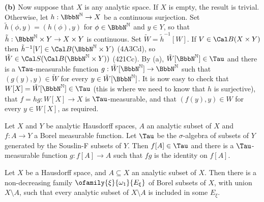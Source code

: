 {\medskip

{\bf (b)} Now suppose that $X$ is any analytic space.   If $X$ is empty,
the result is trivial.   Otherwise, let
$h:\NN\to X$ be a continuous surjection.   Set
$\tilde h(\phi,y)=(h(\phi),y)$ for $\phi\in\NN$ and $y\in Y$, so that
$\tilde h:\NN\times Y\to X\times Y$ is continuous.   Set
$\tilde W=\tilde h^{-1}[W]$.   If
$V\in\Cal B(X\times Y)$ then $\tilde h^{-1}[V]\in\Cal B(\NN\times Y)$
(4A3Cd), so  $\tilde W\in\Cal S(\Cal B(\NN\times Y))$ (421Cc).
By (a), $\tilde W[\NN]\in\Tau$ and there is a $\Tau$-measurable function
$g:\tilde W[\NN]\to\NN$ such that $(g(y),y)\in\tilde W$ for every
$y\in\tilde W[\NN]$.   It is now easy to check that
$W[X]=\tilde W[\NN]\in\Tau$ (this is where we need to know that $h$ is
surjective), that $f=hg:W[X]\to X$ is $\Tau$-measurable, and that
$(f(y),y)\in W$ for every $y\in W[X]$, as required.
}%


 Let $X$ and $Y$ be analytic
Hausdorff spaces, $A$ an analytic subset of $X$ and $f:A\to Y$ a Borel 
measurable function.   Let
$\Tau$ be the $\sigma$-algebra of subsets of $Y$ generated by the
Souslin-F subsets of $Y$.   
Then $f[A]\in\Tau$ and there is a $\Tau$-measurable function 
$g:f[A]\to A$ such that $fg$ is the identity on $f[A]$.


 Let $X$ be a
Hausdorff space, and $A\subseteq X$ an analytic subset of $X$.   Then
there is a non-decreasing family $\ofamily{\xi}{\omega_1}{E_{\xi}}$ of
Borel subsets of $X$, with union $X\setminus A$, such that every
analytic subset of $X\setminus A$ is included in some $E_{\xi}$.


